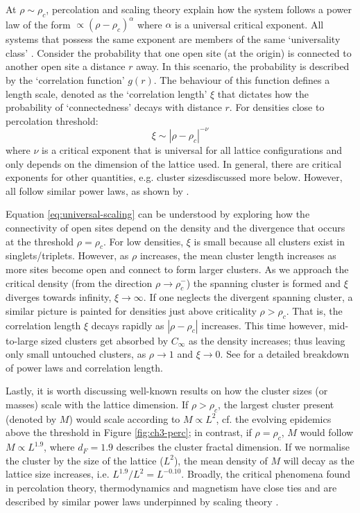 At $\rho \sim \rho_c$, percolation and scaling theory explain how the system follows a power law of the form $\propto (\rho - \rho_c)^{\alpha}$ 
where $\alpha$ is a universal critical exponent.
All systems that possess the same exponent are members of the same `universality class' \cite{PhysRev.180.594, RevModPhys.76.663}.
Consider the probability that one open site (at the origin) is connected to another open site a distance $r$ away. %
In this scenario, the probability is described by the `correlation function' $g(r)$. %
The behaviour of this function defines a length scale, denoted as the `correlation length' $\xi$ that dictates how the probability of `connectedness' decays with distance $r$. %
For densities close to percolation threshold: %
\begin{equation}
    \xi \sim |\rho - \rho_c|^{-\nu}
    \label{eq:universal-scaling}
\end{equation}
where $\nu$ is a critical exponent that is universal for all lattice configurations and only depends on the dimension of the lattice used. In general, there are critical exponents for other quantities, e.g. cluster sizes\textemdash discussed more below. 
However, all follow similar power laws, as shown by \cite{stauffer2018introduction, STAUFFER19791}.

Equation \ref{eq:universal-scaling} can be understood by exploring how the connectivity of open sites depend on the density and the divergence that occurs at the threshold $\rho=\rho_c$. 
For low densities, $\xi$ is small because all clusters exist in singlets/triplets.
However, as $\rho$ increases, the mean cluster length increases as more sites become open and connect to form larger clusters. 
As we approach the critical density (from the direction $\rho \rightarrow \rho_c^{-}$) the spanning cluster is formed and $\xi$ diverges towards infinity, $\xi \rightarrow \infty$. 
If one neglects the divergent spanning cluster, a similar picture is painted for densities just above criticality $\rho > \rho_c$. 
That is, the correlation length $\xi$ decays rapidly as $|\rho - \rho_c|$ increases. 
This time however,  mid-to-large sized clusters get absorbed by $C_\infty$ as the density increases;
thus leaving only small untouched clusters, as $\rho \rightarrow 1$ and $\xi \rightarrow 0 $. 
See \cite{STAUFFER19791} for a detailed breakdown of power laws and correlation length.

Lastly, it is worth discussing well-known results on how the cluster sizes (or masses) scale with the lattice dimension. 
If $\rho > \rho_c$, the largest cluster present (denoted by $M$) would scale according to $M\propto L^{2}$, cf. the evolving epidemics above the threshold in Figure \ref{fig:ch3-perc}; 
in contrast, if $\rho = \rho_c$, $M$ would follow $M\propto L^{1.9}$, 
where $d_F=1.9$ describes the cluster fractal dimension.
If we normalise the cluster by the size of the lattice ($L^2$), the mean density of $M$ will decay as the lattice size increases, i.e. $L^{1.9}/L^2 = L^{-0.10}$. 
Broadly, the critical phenomena found in percolation theory, thermodynamics and magnetism have close ties and are described by similar power laws underpinned by scaling theory \cite{Essam_1980}.

